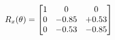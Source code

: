 \documentclass[preview]{standalone}
\begin{document}
\begin{align*}
\special{dvisvgm:raw <g id='unique000'>}R_{x}(\theta) = \begin{bmatrix}1 & 0 & 0 \\0 & -0.85 & +0.53 \\0 & -0.53 & -0.85\end{bmatrix}\special{dvisvgm:raw </g>}
\end{align*}
\end{document}
